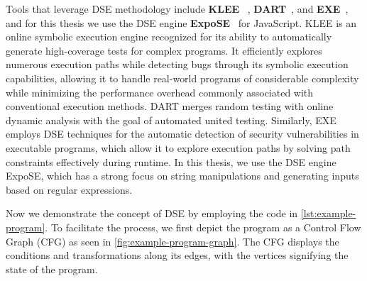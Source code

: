 Tools that leverage DSE methodology include \textbf{KLEE}
~\cite{cadar_klee_2008}, \textbf{DART}~\cite{godefroid_dart_2005}, and \textbf{EXE}~\cite{cadar_exe_2008},
and for this thesis we use the DSE engine \textbf{ExpoSE}~\cite{loring_expose_2017} for JavaScript. 
KLEE is an online symbolic execution engine recognized for its ability to automatically generate high-coverage tests for complex programs. It efficiently explores numerous execution paths while detecting bugs through its symbolic execution capabilities, allowing it to handle real-world programs of considerable complexity while minimizing the performance overhead commonly associated with conventional execution methods. 
DART merges random testing with online dynamic analysis with the goal of automated united testing.
Similarly, EXE employs DSE techniques for the automatic detection of security vulnerabilities in executable programs, which allow it to explore execution paths by solving path constraints effectively during runtime.
In this thesis, we use the DSE engine ExpoSE, which has a strong focus on string manipulations and generating inputs based on regular expressions. 

Now we demonstrate the concept of DSE by employing the code in \autoref{lst:example-program}. 
To facilitate the process, we first depict the program as a Control Flow Graph (CFG) as seen in \autoref{fig:example-program-graph}. 
The CFG displays the conditions and transformations along its edges, with the vertices signifying the state of the program.


